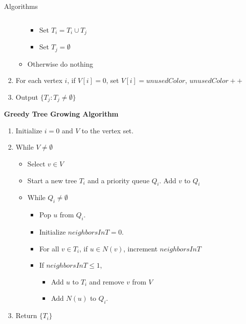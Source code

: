 \documentclass[serif,mathserif,final]{beamer}
\begin{document}
\begin{frame}{}
\begin{columns}[t]
\begin{column}{0.49\linewidth}
\begin{block}{\Huge Algorithms}
\begin{columns}[t]
\begin{column}{0.49\linewidth}
\begin{framed}
\begin{enumerate}
\begin{itemize}
\begin{itemize}
\item Set $T_i=T_i\cup T_j$
\item Set $T_j=\emptyset$
\end{itemize}
\item Otherwise do nothing
\end{itemize}
\item For each vertex $i$, if $V[i]=0$, set $V[i]=unusedColor$, $unusedColor++$
\item Output $\{T_j:T_j\neq\emptyset\}$
\end{enumerate}
\end{framed}

\begin{framed}
\noindent\textbf{\Large Greedy Tree Growing Algorithm} %
\begin{enumerate}
\Large
\item Initialize $i=0$ and $V$ to the vertex set.
\item While $V\neq\emptyset$
\begin{itemize}
\large
\item Select $v\in V$
\item Start a new tree $T_i$ and a priority queue $Q_i$. Add $v$ to $Q_i$
\item While $Q_i\neq\emptyset$
\begin{itemize}
\normalsize
\item Pop $u$ from $Q_i$.
\item Initialize $neighborsInT=0$.
\item For all $v\in T_i$, if $u\in N(v)$, increment $neighborsInT$
\item If $neighborsInT\le1$,
\begin{itemize}
\item Add $u$ to $T_i$ and remove $v$ from $V$
\item Add $N(u)$ to $Q_i$.
\end{itemize}
\end{itemize}
\end{itemize}
\item Return $\{T_i\}$
\end{enumerate}
\end{framed}

			\end{column}
			\begin{column}{0.49\linewidth}


\end{column}
\end{columns}
\end{block}
\end{column}
\end{columns}
\end{frame}
\end{document}
